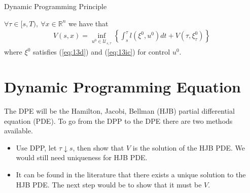 \begin{theorem}{Dynamic Programming Principle}

$\forall \tau\in[s,T),~\forall x\in\mathbb{R}^n$ we have that%
\begin{align}
\label{eq:13dpp}
V(s,x) = \inf_{u^0\in\mathcal{U}_{s,\tau}} \left\lbrace \int_s^\tau l(\xi^0,u^0)dt + V(\tau,\xi_\tau^0) \right\rbrace
\end{align}
where $\xi^0$ satisfies (\ref{eq:13d}) and (\ref{eq:13ic}) for control $u^0$.
\end{theorem}

\section{Dynamic Programming Equation}
The DPE will be the Hamilton, Jacobi, Bellman (HJB) partial differential equation (PDE).
To go from the DPP to the DPE there are two methods available.
\begin{itemize}
\item Use DPP, let $\tau\downarrow s$, then show that $V$ is the solution of the HJB PDE\@.
      We would still need uniqueness for HJB PDE\@.
\item It can be found in the literature that there exists a unique solution to the HJB PDE\@.
      The next step would be to show that it must be $V$.
\end{itemize}


